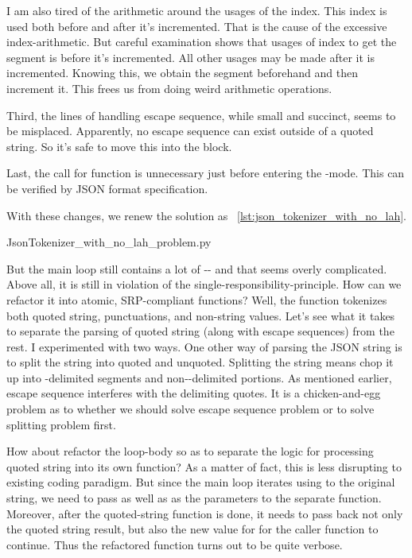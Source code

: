 I am also tired of the arithmetic around the usages of the index.
This index is used both before and after it's incremented.
That is the cause of the excessive index-arithmetic.
But careful examination shows that usages of index to get the segment is before it's incremented.
All other usages may be made after it is incremented.
Knowing this, we obtain the segment beforehand and then increment it.
This frees us from doing weird arithmetic operations.

Third, the lines of handling escape sequence, while small and succinct, seems to be misplaced.
Apparently, no escape sequence can exist outside of a quoted string.
So it's safe to move this into the  block.

Last, the call for function  is unnecessary just before entering the
-mode.
This can be verified by JSON format specification.

With these changes, we renew the solution as ~\autoref{lst:json_tokenizer_with_no_lah}.


{JsonTokenizer_with_no_lah_problem.py}

But the main loop still contains a lot of -- and that seems overly
complicated.
Above all, it is still in violation of the single-responsibility-principle.
How can we refactor it into atomic, SRP-compliant functions?
Well, the function  tokenizes both quoted string, punctuations,
and non-string values.
Let's see what it takes to separate the parsing of quoted string (along with escape sequences) from
the rest.
I experimented with two ways.
One other way of parsing the JSON string is to split the string into quoted and unquoted.
Splitting the string means chop it up into -delimited segments and non--delimited
portions.
As mentioned earlier, escape sequence  interferes with the delimiting quotes.
It is a chicken-and-egg problem as to whether we should solve escape sequence problem or
to solve splitting problem first.

How about refactor the loop-body so as to separate the logic for processing quoted string into
its own function?
As a matter of fact, this is less disrupting to existing coding paradigm.
But since the main loop iterates using  to the original string, we need to pass
 as well as  as the parameters to the separate function.
Moreover, after the quoted-string function is done, it needs to pass back not only the quoted
string result, but also the new value for
 for the caller function to continue.
Thus the refactored function turns out to be quite verbose.

